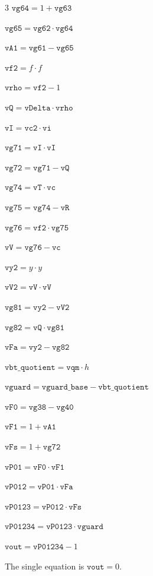\documentclass[10pt]{article}
\begin{document}
\begin{multicols}{3}
\noindent $\mathtt{vg64} = 1+\mathtt{vg63}$\par
\noindent $\mathtt{vg65} = \mathtt{vg62}\cdot \mathtt{vg64}$\par
\noindent $\mathtt{vA1} = \mathtt{vg61}-\mathtt{vg65}$\par
\noindent $\mathtt{vf2} = f\cdot f$\par
\noindent $\mathtt{vrho} = \mathtt{vf2}-1$\par
\noindent $\mathtt{vQ} = \mathtt{vDelta}\cdot \mathtt{vrho}$\par
\noindent $\mathtt{vI} = \mathtt{vc2}\cdot \mathtt{vi}$\par
\noindent $\mathtt{vg71} = \mathtt{vI}\cdot \mathtt{vI}$\par
\noindent $\mathtt{vg72} = \mathtt{vg71}-\mathtt{vQ}$\par
\noindent $\mathtt{vg74} = \mathtt{vT}\cdot \mathtt{vc}$\par
\noindent $\mathtt{vg75} = \mathtt{vg74}-\mathtt{vR}$\par
\noindent $\mathtt{vg76} = \mathtt{vf2}\cdot \mathtt{vg75}$\par
\noindent $\mathtt{vV} = \mathtt{vg76}-\mathtt{vc}$\par
\noindent $\mathtt{vy2} = y\cdot y$\par
\noindent $\mathtt{vV2} = \mathtt{vV}\cdot \mathtt{vV}$\par
\noindent $\mathtt{vg81} = \mathtt{vy2}-\mathtt{vV2}$\par
\noindent $\mathtt{vg82} = \mathtt{vQ}\cdot \mathtt{vg81}$\par
\noindent $\mathtt{vFa} = \mathtt{vy2}-\mathtt{vg82}$\par
\noindent $\mathtt{vbt\_quotient} = \mathtt{vqm}\cdot h$\par
\noindent $\mathtt{vguard} = \mathtt{vguard\_base}-\mathtt{vbt\_quotient}$\par
\noindent $\mathtt{vF0} = \mathtt{vg38}-\mathtt{vg40}$\par
\noindent $\mathtt{vF1} = 1+\mathtt{vA1}$\par
\noindent $\mathtt{vFs} = 1+\mathtt{vg72}$\par
\noindent $\mathtt{vP01} = \mathtt{vF0}\cdot \mathtt{vF1}$\par
\noindent $\mathtt{vP012} = \mathtt{vP01}\cdot \mathtt{vFa}$\par
\noindent $\mathtt{vP0123} = \mathtt{vP012}\cdot \mathtt{vFs}$\par
\noindent $\mathtt{vP01234} = \mathtt{vP0123}\cdot \mathtt{vguard}$\par
\noindent $\mathtt{vout} = \mathtt{vP01234}-1$\par
\end{multicols}
The single equation is $\boxed{\mathtt{vout}=0}$.
\end{document}
